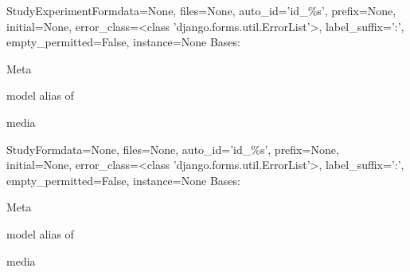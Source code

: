 \documentclass[letterpaper,10pt,english]{sphinxmanual}
\begin{document}
\hypertarget{data.forms.StudyExperimentForm}{}\begin{classdesc}{StudyExperimentForm}{data=None, files=None, auto\_id='id\_\%s', prefix=None, initial=None, error\_class=\textless{}class 'django.forms.util.ErrorList'\textgreater{}, label\_suffix=':', empty\_permitted=False, instance=None}
Bases: 

\hypertarget{data.forms.StudyExperimentForm.Meta}{}\begin{classdesc}{Meta}{}~

\hypertarget{data.forms.StudyExperimentForm.Meta.model}{}\begin{memberdesc}{model}
alias of 
\end{memberdesc}
\end{classdesc}

\hypertarget{data.forms.StudyExperimentForm.media}{}\begin{memberdesc}[StudyExperimentForm]{media}\end{memberdesc}
\end{classdesc}

\hypertarget{data.forms.StudyForm}{}\begin{classdesc}{StudyForm}{data=None, files=None, auto\_id='id\_\%s', prefix=None, initial=None, error\_class=\textless{}class 'django.forms.util.ErrorList'\textgreater{}, label\_suffix=':', empty\_permitted=False, instance=None}
Bases: 

\hypertarget{data.forms.StudyForm.Meta}{}\begin{classdesc}{Meta}{}~

\hypertarget{data.forms.StudyForm.Meta.model}{}\begin{memberdesc}{model}
alias of 
\end{memberdesc}
\end{classdesc}

\hypertarget{data.forms.StudyForm.media}{}\begin{memberdesc}[StudyForm]{media}\end{memberdesc}
\end{classdesc}
\end{document}
